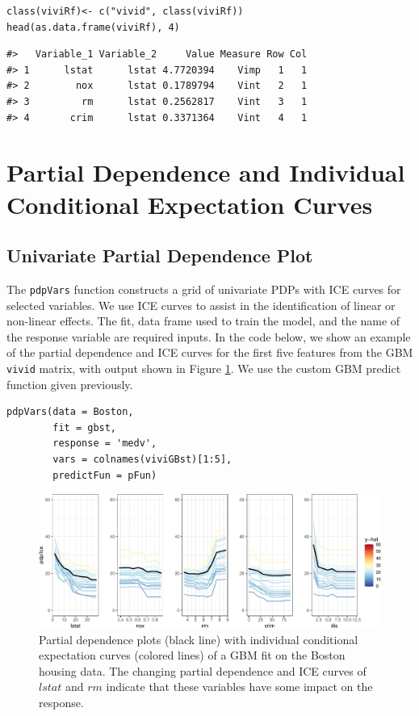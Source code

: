 \begin{verbatim}
class(viviRf)<- c("vivid", class(viviRf))
head(as.data.frame(viviRf), 4)
\end{verbatim}

\begin{verbatim}
#>   Variable_1 Variable_2     Value Measure Row Col
#> 1      lstat      lstat 4.7720394    Vimp   1   1
#> 2        nox      lstat 0.1789794    Vint   2   1
#> 3         rm      lstat 0.2562817    Vint   3   1
#> 4       crim      lstat 0.3371364    Vint   4   1
\end{verbatim}

\hypertarget{GPDP}{%
\section{Partial Dependence and Individual Conditional Expectation Curves}\label{GPDP}}

\hypertarget{univariate-partial-dependence-plot}{%
\subsection{Univariate Partial Dependence Plot}\label{univariate-partial-dependence-plot}}

The \texttt{pdpVars} function constructs a grid of univariate PDPs with ICE curves for selected variables. We use ICE curves to assist in the identification of linear or non-linear effects. The fit, data frame used to train the model, and the name of the response variable are required inputs. In the code below, we show an example of the partial dependence and ICE curves for the first five features from the GBM \texttt{vivid} matrix, with output shown in Figure \ref{fig:pdpRf}. We use the custom GBM predict function given previously.

\begin{verbatim}
pdpVars(data = Boston,
        fit = gbst,
        response = 'medv',
        vars = colnames(viviGBst)[1:5],
        predictFun = pFun)
\end{verbatim}

\begin{figure}

{\centering \includegraphics[width=0.75\linewidth]{vivid_files/figure-latex/pdpRf-1} 

}

\caption{Partial dependence plots (black line) with individual conditional expectation curves (colored lines) of a GBM fit on the Boston housing data. The changing partial dependence and ICE curves of $lstat$ and $rm$ indicate that these variables have some impact on the response.}\label{fig:pdpRf}
\end{figure}

